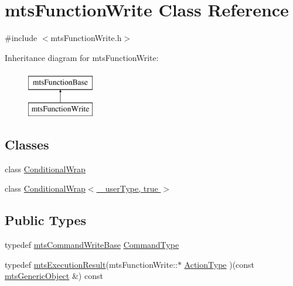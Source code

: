 \hypertarget{classmts_function_write}{\section{mts\-Function\-Write Class Reference}
\label{classmts_function_write}
}


{\ttfamily \#include $<$mts\-Function\-Write.\-h$>$}

Inheritance diagram for mts\-Function\-Write\-:\begin{figure}[H]
\begin{center}
\leavevmode
\includegraphics[height=2.000000cm]{d7/dc3/classmts_function_write}
\end{center}
\end{figure}
\subsection*{Classes}
\begin{DoxyCompactItemize}
\item 
class \hyperlink{classmts_function_write_1_1_conditional_wrap}{Conditional\-Wrap}
\item 
class \hyperlink{classmts_function_write_1_1_conditional_wrap_3_01__user_type_00_01true_01_4}{Conditional\-Wrap$<$ \-\_\-user\-Type, true $>$}
\end{DoxyCompactItemize}
\subsection*{Public Types}
\begin{DoxyCompactItemize}
\item 
typedef \hyperlink{classmts_command_write_base}{mts\-Command\-Write\-Base} \hyperlink{classmts_function_write_a4b81286be87adec18b358ebaa9ebb2be}{Command\-Type}
\item 
typedef \hyperlink{classmts_execution_result}{mts\-Execution\-Result}(mts\-Function\-Write\-::$\ast$ \hyperlink{classmts_function_write_ae04f4fc0dcdb45574b7b1e978cc7c31b}{Action\-Type} )(const \hyperlink{classmts_generic_object}{mts\-Generic\-Object} \&) const 
\end{DoxyCompactItemize}
